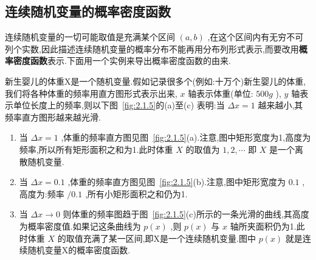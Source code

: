 \subsection{连续随机变量的概率密度函数}\label{ssec:2.1.4}

连续随机变量的一切可能取值是充满某个区间 $ (a,b) $ ,在这个区间内有无穷不可列个实数,因此描述连续随机变量的概率分布不能再用分布列形式表示,而要改用\textbf{概率密度函数}表示.下面用一个实例来导出概率密度函数的由来.

\begin{example}\label{exam:2.1.6}
	新生婴儿的体重X是一个随机变量.假如记录很多个(例如:十万个)新生婴儿的体重,我们将各种体重的频率用直方图形式表示出来, $ x $ 轴表示体重(单位: $ 500g $ ), $ y $ 轴表示单位长度上的频率,则以下图~\ref{fig:2.1.5}的(a)至(c)
	表明:当 $ \Delta x=1 $ 越来越小,其频率直方图形越来越光滑.
	
	\begin{enumerate}
		\item 当 $ \Delta x=1 $ ,体重的频率直方图见图~\ref{fig:2.1.5}(a).注意,图中矩形宽度为1,高度为频率,所以所有矩形面积之和为1.此时体重 $ X $ 的取值为 $ 1,2, \cdots $ 即 $ X $ 是一个离散随机变量.
		\item 当 $ \Delta x=0.1 $ ,体重的频率直方图见图~\ref{fig:2.1.5}(b).注意,图中矩形宽度为
		 $ 0.1 $ ,高度为:频率 $ /0.1 $ ,所有小矩形面积之和仍为1.
		\item 当 $ \Delta x \rightarrow 0 $ 则体重的频率图趋于图~\ref{fig:2.1.5}(c)所示的一条光滑的曲线,其高度为概率密度值.如果记这条曲线为 $ p(x) $ ,则 $ p(x) $ 与 $ x $ 轴所夹面积仍为1.此时体重 $ X $ 的取值充满了某一区间,即X是一个连续随机变量.图中 $ p(x) $ 就是连续随机变量X的概率密度函数.
	\end{enumerate}
	
\end{example}

